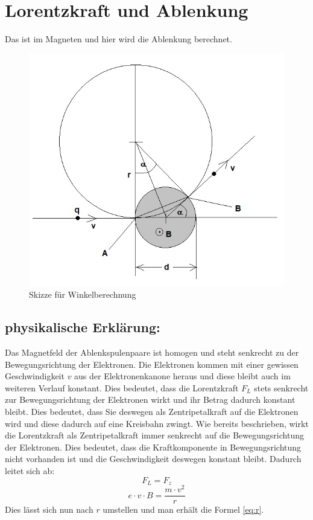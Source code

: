\section{Lorentzkraft und Ablenkung}

Das ist im Magneten und hier wird die Ablenkung berechnet.
\begin{figure}
    \centering
    \includegraphics[width=.75\textwidth]{fig/elektronenstrahl-ablenkung_101.jpg}
    \caption{Skizze für Winkelberechnung}
    \label{fig:ausBlock}
\end{figure}

\subsection{physikalische Erklärung:}
Das Magnetfeld der Ablenkspulenpaare ist homogen und steht senkrecht zu der Bewegungsrichtung der Elektronen. Die Elektronen kommen mit einer gewissen Geschwindigkeit $v$ aus der Elektronenkanone heraus und diese bleibt auch im weiteren Verlauf konstant. Dies bedeutet, dass die Lorentzkraft $F_L$ stets senkrecht zur Bewegungsrichtung der Elektronen wirkt und ihr Betrag dadurch konstant bleibt. Dies bedeutet, dass Sie deswegen als Zentripetalkraft auf die Elektronen wird und diese dadurch auf eine Kreisbahn zwingt. Wie bereits beschrieben, wirkt die Lorentzkraft als Zentripetalkraft immer senkrecht auf die Bewegungsrichtung der Elektronen. Dies bedeutet, dass die Kraftkomponente in Bewegungsrichtung nicht vorhanden ist und die Geschwindigkeit deswegen konstant bleibt. Dadurch leitet sich ab: 
$$ F_L=F_z$$
$$ e \cdot v \cdot B = \frac{m \cdot v^2}{r}$$
Dies lässt sich nun nach $r$ umstellen und man erhält die Formel \ref{eq:r}.   

